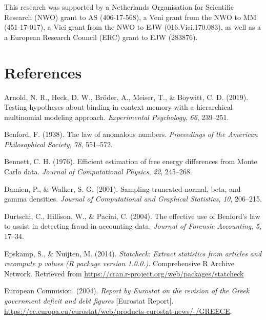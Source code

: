 \documentclass[
  english,
  man,floatsintext]{apa6}
\begin{document}
This research was supported by a Netherlands Organisation for Scientific Research (NWO) grant
to AS (406-17-568), a Veni grant from the NWO to MM (451-17-017), a Vici grant from the NWO to EJW (016.Vici.170.083), as well as a a European Research Council (ERC) grant to EJW (283876).

\clearpage

\hypertarget{references}{%
\section{References}\label{references}}

\begingroup
\setlength{\parindent}{-0.5in}
\setlength{\leftskip}{0.5in}

\hypertarget{refs}{}
\leavevmode\hypertarget{ref-arnold2019testing}{}%
Arnold, N. R., Heck, D. W., Bröder, A., Meiser, T., \& Boywitt, C. D. (2019). Testing hypotheses about binding in context memory with a hierarchical multinomial modeling approach. \emph{Experimental Psychology}, \emph{66}, 239--251.

\leavevmode\hypertarget{ref-benford1938law}{}%
Benford, F. (1938). The law of anomalous numbers. \emph{Proceedings of the American Philosophical Society}, \emph{78}, 551--572.

\leavevmode\hypertarget{ref-bennett1976efficient}{}%
Bennett, C. H. (1976). Efficient estimation of free energy differences from Monte Carlo data. \emph{Journal of Computational Physics}, \emph{22}, 245--268.

\leavevmode\hypertarget{ref-damien2001sampling}{}%
Damien, P., \& Walker, S. G. (2001). Sampling truncated normal, beta, and gamma densities. \emph{Journal of Computational and Graphical Statistics}, \emph{10}, 206--215.

\leavevmode\hypertarget{ref-durtschi2004effective}{}%
Durtschi, C., Hillison, W., \& Pacini, C. (2004). The effective use of Benford's law to assist in detecting fraud in accounting data. \emph{Journal of Forensic Accounting}, \emph{5}, 17--34.

\leavevmode\hypertarget{ref-epskamp2014statcheck}{}%
Epskamp, S., \& Nuijten, M. (2014). \emph{Statcheck: Extract statistics from articles and recompute p values (R package version 1.0.0.)}. Comprehensive R Archive Network. Retrieved from \url{https://cran.r-project.org/web/packages/statcheck}

\leavevmode\hypertarget{ref-europeanCommision2004}{}%
European Commision. (2004). \emph{Report by Eurostat on the revision of the Greek government deficit and debt figures} {[}Eurostat Report{]}. \url{https://ec.europa.eu/eurostat/web/products-eurostat-news/-/GREECE}.
\end{document}
